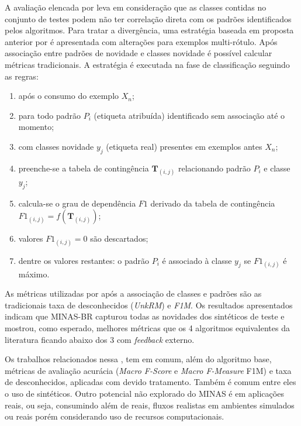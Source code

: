 
A avaliação elencada por  leva em consideração que as classes
contidas no conjunto de testes podem não ter correlação direta com os padrões identificados
pelos algoritmos.
Para tratar a divergência, uma estratégia baseada em proposta anterior por
 é apresentada com alterações para exemplos multi-rótulo.
Após associação entre padrões de novidade e classes novidade é possível calcular
métricas tradicionais.
A estratégia é executada na fase de classificação seguindo as regras:

\begin{enumerate}

    \item após o consumo do exemplo $X_n$;
    
    \item para todo padrão $P_i$ (etiqueta atribuída) identificado sem
    associação até o momento;
    
    \item com classes novidade $y_j$ (etiqueta real) presentes em exemplos antes
    $X_n$;
    
    \item preenche-se a tabela de contingência $\mathbf{T}_{(i,j)}$ relacionando
    padrão $P_i$ e classe $y_j$;
    
    \item calcula-se o grau de dependência $\mathit{F1}$ derivado da tabela de
    contingência $\mathit{F1}_{(i,j)} = f(\mathbf{T}_{(i,j)})$;
    
    \item valores $\mathit{F1}_{(i,j)} = 0$ são descartados;
    
    \item dentre os valores restantes: o padrão $P_i$ é associado à classe $y_j$
    se $\mathit{F1}_{(i,j)}$ é máximo.

\end{enumerate}

As métricas utilizadas por  após a associação de classes e
padrões são as tradicionais taxa de desconhecidos (\emph{UnkRM}) e \emph{F1M}.
Os resultados apresentados indicam que MINAS-BR capturou todas as novidades dos
\datasets sintéticos de teste e mostrou, como esperado, melhores métricas que os
4 algoritmos equivalentes da literatura ficando abaixo dos 3 com \emph{feedback}
externo.

Os trabalhos relacionados nessa , tem em
comum, além do algoritmo base, métricas de avaliação acurácia (\emph{Macro F-Score} e \emph{Macro
F-Measure} F1M) e taxa de desconhecidos, aplicadas com devido tratamento.
Também é comum entre eles o uso de \datasets sintéticos.
Outro potencial não explorado do MINAS é em aplicações reais, ou seja,
consumindo além de \datasets reais, fluxos realistas em ambientes simulados ou
reais porém considerando uso de recursos computacionais.


